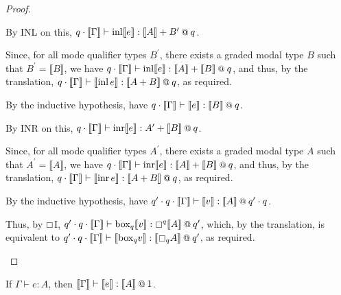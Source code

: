 \documentclass[acmsmall,screen,nonacm]{acmart}
\makeatletter
\newcommand{\at}{\mathbin{\mbox{\small\ensuremath{@}}}}
\DeclareMathOperator{\inl}{\text{inl}}
\DeclareMathOperator{\inr}{\text{inr}}
\newcommand{\tee}{\vdash}
\newcommand{\sem}[1]{\llbracket #1 \rrbracket}
\makeatother
\begin{document}
\begin{proof}
\begin{description}
    By INL on this, $q \cdot \sem{\Gamma} \tee \inl \sem{e} : \sem{A} + B^\prime \at q$. 
    
    Since, for all mode qualifier types $B^\prime$, there exists a graded modal type $B$ such that $B^\prime = \sem{B}$, we have $q \cdot \sem{\Gamma} \tee \inl \sem{e} : \sem{A} + \sem{B} \at q$, and thus, by the translation, $q \cdot \sem{\Gamma} \tee \sem{\inl e} : \sem{A + B} \at q$, as required.
    \\
    \item[Case INR.]
    By the inductive hypothesis, have $q \cdot \sem{\Gamma} \tee \sem{e} : \sem{B} \at q$. 
    
    By INR on this, $q \cdot \sem{\Gamma} \tee \inr \sem{e} : A^\prime + \sem{B} \at q$. 
    
    Since, for all mode qualifier types $A^\prime$, there exists a graded modal type $A$ such that $A^\prime = \sem{A}$, we have $q \cdot \sem{\Gamma} \tee \inr \sem{e} : \sem{A} + \sem{B} \at q$, and thus, by the translation, $q \cdot \sem{\Gamma} \tee \sem{\inr e} : \sem{A + B} \at q$, as required.
    \\
    \item[Case $\boxempty$I.]
    By the inductive hypothesis, have $q^\prime \cdot q \cdot \sem{\Gamma} \tee \sem{v} : \sem{A} \at q^\prime \cdot q$. 
    
    Thus, by $\boxempty$I, $q^\prime \cdot q \cdot \sem{\Gamma} \tee \mathrm{box}_q \sem{v} : \boxempty^q \sem{A} \at q^\prime$, which, by the translation, is equivalent to $q^\prime \cdot q \cdot \sem{\Gamma} \tee \sem{\mathrm{box}_q v} : \sem{\boxempty_q A} \at q^\prime$, as required.
  \end{description}
\end{proof}

\begin{theorem}
\label{thm:graded-modal-to-mode-qualifiers-exprs}
If $\Gamma \tee e : A$, then $\sem{\Gamma} \tee \sem{e} : \sem{A} \at 1$.
\end{theorem}
\end{document}
